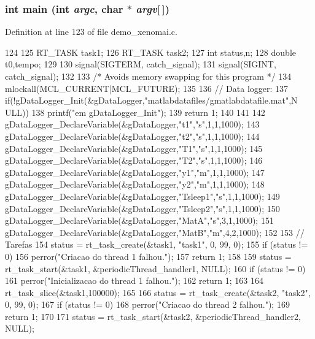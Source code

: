 \subsubsection[{main}]{\setlength{\rightskip}{0pt plus 5cm}int main (int {\em argc}, \/  char $\ast$ {\em argv}[$\,$])}\label{demo__xenomai_8c_a0ddf1224851353fc92bfbff6f499fa97}


Definition at line 123 of file demo\_\-xenomai.c.


\begin{DoxyCode}
124 {
125         RT_TASK task1;
126         RT_TASK task2;
127         int status,n;
128         double t0,tempo;
129                 
130         signal(SIGTERM, catch_signal);
131         signal(SIGINT, catch_signal);
132 
133         /* Avoids memory swapping for this program */
134         mlockall(MCL_CURRENT|MCL_FUTURE);
135         
136         // Data logger:
137         if(!gDataLogger_Init(&gDataLogger,"matlabdatafiles/gmatlabdatafile.mat",N
      ULL)){
138                 printf("\nErro em gDataLogger_Init\n\n");
139                 return 1;
140         }
141 
142         gDataLogger_DeclareVariable(&gDataLogger,"t1","s",1,1,1000);
143         gDataLogger_DeclareVariable(&gDataLogger,"t2","s",1,1,1000);
144         gDataLogger_DeclareVariable(&gDataLogger,"T1","s",1,1,1000);
145         gDataLogger_DeclareVariable(&gDataLogger,"T2","s",1,1,1000);
146         gDataLogger_DeclareVariable(&gDataLogger,"y1","m",1,1,1000);
147         gDataLogger_DeclareVariable(&gDataLogger,"y2","m",1,1,1000);
148         gDataLogger_DeclareVariable(&gDataLogger,"Tsleep1","s",1,1,1000);
149         gDataLogger_DeclareVariable(&gDataLogger,"Tsleep2","s",1,1,1000);
150         gDataLogger_DeclareVariable(&gDataLogger,"MatA","s",3,1,1000);
151         gDataLogger_DeclareVariable(&gDataLogger,"MatB","m",4,2,1000);  
152 
153         // Tarefas
154         status = rt_task_create(&task1, "task1", 0, 99, 0);
155         if (status != 0) {
156                 perror("Criacao do thread 1 falhou.\n");
157                 return 1;
158         }
159         status = rt_task_start(&task1, &periodicThread_handler1, NULL);
160         if (status != 0) {
161                 perror("Inicializacao do thread 1 falhou.\n");
162                 return 1;
163         }
164         rt_task_slice(&task1,100000);
165 
166         status = rt_task_create(&task2, "task2", 0, 99, 0);
167         if (status != 0) {
168                 perror("Criacao do thread 2 falhou.\n");
169                 return 1;
170         }
171         status = rt_task_start(&task2, &periodicThread_handler2, NULL);
}
\end{DoxyCode}
